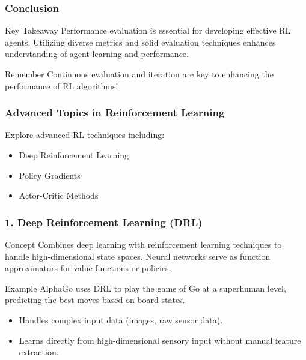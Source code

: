 \documentclass[aspectratio=169]{beamer}
\begin{document}
\begin{frame}[fragile]
    \frametitle{Conclusion}
    \begin{block}{Key Takeaway}
        Performance evaluation is essential for developing effective RL agents. Utilizing diverse metrics and solid evaluation techniques enhances understanding of agent learning and performance.
    \end{block}
    \begin{block}{Remember}
        Continuous evaluation and iteration are key to enhancing the performance of RL algorithms!
    \end{block}
\end{frame}

\begin{frame}[fragile]
    \frametitle{Advanced Topics in Reinforcement Learning}
    Explore advanced RL techniques including:
    \begin{itemize}
        \item Deep Reinforcement Learning
        \item Policy Gradients
        \item Actor-Critic Methods
    \end{itemize}
\end{frame}

\begin{frame}[fragile]
    \frametitle{1. Deep Reinforcement Learning (DRL)}
    \begin{block}{Concept}
        Combines deep learning with reinforcement learning techniques to handle high-dimensional state spaces. Neural networks serve as function approximators for value functions or policies.
    \end{block}
    
    \begin{block}{Example}
        AlphaGo uses DRL to play the game of Go at a superhuman level, predicting the best moves based on board states.
    \end{block}

    \begin{itemize}
        \item Handles complex input data (images, raw sensor data).
        \item Learns directly from high-dimensional sensory input without manual feature extraction.
    \end{itemize}
\end{frame}
\end{document}
